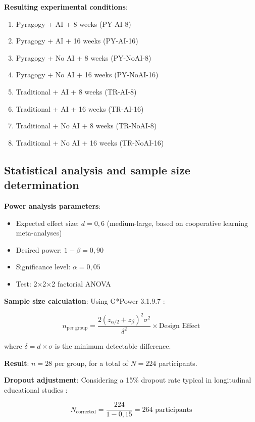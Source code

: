 \textbf{Resulting experimental conditions}:
\begin{enumerate}
    \item Pyragogy + AI + 8 weeks (PY-AI-8)
    \item Pyragogy + AI + 16 weeks (PY-AI-16)
    \item Pyragogy + No AI + 8 weeks (PY-NoAI-8)
    \item Pyragogy + No AI + 16 weeks (PY-NoAI-16)
    \item Traditional + AI + 8 weeks (TR-AI-8)
    \item Traditional + AI + 16 weeks (TR-AI-16)
    \item Traditional + No AI + 8 weeks (TR-NoAI-8)
    \item Traditional + No AI + 16 weeks (TR-NoAI-16)
\end{enumerate}

\subsection{Statistical analysis and sample size determination}

\textbf{Power analysis parameters}:
\begin{itemize}
    \item Expected effect size: $d = 0{,}6$ (medium-large, based on cooperative learning meta-analyses)
    \item Desired power: $1 - \beta = 0{,}90$
    \item Significance level: $\alpha = 0{,}05$
    \item Test: 2×2×2 factorial ANOVA
\end{itemize}

\textbf{Sample size calculation}: 
Using G*Power 3.1.9.7 \cite{Faul2007}:

\begin{equation}
n_{\text{per group}} = \frac{2(z_{\alpha/2} + z_\beta)^2 \sigma^2}{\delta^2} \times \text{Design Effect}
\label{eq:power-analysis}
\end{equation}

where $\delta = d \times \sigma$ is the minimum detectable difference.

\textbf{Result}: $n = 28$ per group, for a total of $N = 224$ participants.

\textbf{Dropout adjustment}: Considering a 15\% dropout rate typical in longitudinal educational studies \cite{Shadish2002}:

\begin{equation}
N_{\text{corrected}} = \frac{224}{1 - 0{,}15} = 264 \text{ participants}
\label{eq:dropout-adjustment}
\end{equation}

